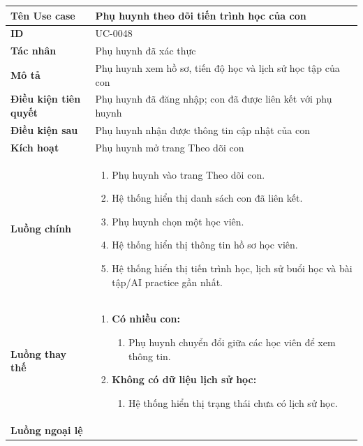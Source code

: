 {
\renewcommand{\arraystretch}{1.5}

\begin{tabularx}{\textwidth}{|>{\raggedright\arraybackslash}X|>{\raggedright\arraybackslash}X|}
\hline
\textbf{Tên Use case} & Phụ huynh theo dõi tiến trình học của con \\
\hline
\textbf{ID} & UC-0048 \\
\hline
\textbf{Tác nhân} & Phụ huynh đã xác thực \\
\hline
\textbf{Mô tả} & Phụ huynh xem hồ sơ, tiến độ học và lịch sử học tập của con \\
\hline
\textbf{Điều kiện tiên quyết} & Phụ huynh đã đăng nhập; con đã được liên kết với phụ huynh \\
\hline
\textbf{Điều kiện sau} & Phụ huynh nhận được thông tin cập nhật của con \\
\hline
\textbf{Kích hoạt} & Phụ huynh mở trang Theo dõi con \\
\hline
\textbf{Luồng chính} &
\begin{enumerate}
    \item Phụ huynh vào trang Theo dõi con.
    \item Hệ thống hiển thị danh sách con đã liên kết.
    \item Phụ huynh chọn một học viên.
    \item Hệ thống hiển thị thông tin hồ sơ học viên.
    \item Hệ thống hiển thị tiến trình học, lịch sử buổi học và bài tập/AI practice gần nhất.
\end{enumerate} \\
\hline
\textbf{Luồng thay thế} &
\begin{enumerate}
    \item \textbf{Có nhiều con:}
    \begin{enumerate}
        \item[3A.] Phụ huynh chuyển đổi giữa các học viên để xem thông tin.
    \end{enumerate}
    \item \textbf{Không có dữ liệu lịch sử học:}
    \begin{enumerate}
        \item[5B.] Hệ thống hiển thị trạng thái chưa có lịch sử học.
    \end{enumerate}
\end{enumerate} \\
\hline
\textbf{Luồng ngoại lệ} &
\begin{enumerate}

\end{enumerate}
\end{tabularx}}
